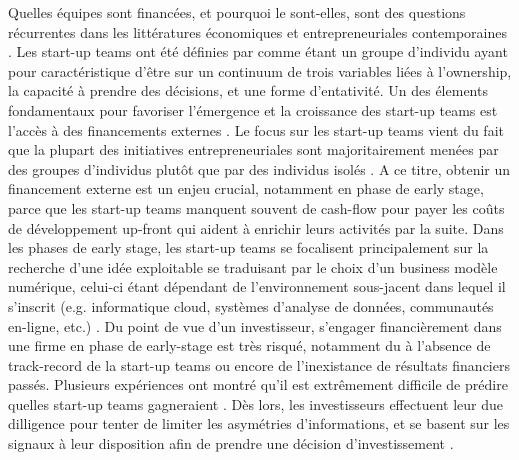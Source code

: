 \documentclass[12pt]{article}
\begin{document}
Quelles équipes sont financées, et pourquoi le sont-elles, sont des questions récurrentes dans les littératures économiques et entrepreneuriales contemporaines \citep{knight2020start}. Les start-up teams ont été définies par \citet{knight2020start} comme étant un groupe d'individu ayant pour caractéristique d'être sur un continuum de trois variables liées à l'ownership, la capacité à prendre des décisions, et une forme d'entativité. Un des élements fondamentaux pour favoriser l'émergence et la croissance des start-up teams est l'accès à des financements externes \citep{klein2020start}. Le focus sur les start-up teams vient du fait que la plupart des initiatives entrepreneuriales sont majoritairement menées par des groupes d'individus plutôt que par des individus isolés \citep{klotz2014new, roure1990predictors}. A ce titre, obtenir un financement externe est un enjeu crucial, notamment en phase de early stage, parce que les start-up teams manquent souvent de cash-flow pour payer les coûts de développement up-front qui aident à enrichir leurs activités par la suite. Dans les phases de early stage, les start-up teams se focalisent principalement sur la recherche d'une idée exploitable se traduisant par le choix d'un business modèle numérique, celui-ci étant dépendant de l'environnement sous-jacent dans lequel il s'inscrit (e.g. informatique cloud, systèmes d’analyse de données, communautés en-ligne, etc.) \citep{nambisan2017digital}. Du point de vue d'un investisseur, s'engager financièrement dans une firme en phase de early-stage est très risqué, notamment du à l'absence de track-record de la start-up teams ou encore de l'inexistance de résultats financiers passés. Plusieurs expériences ont montré qu'il est extrêmement difficile de prédire quelles start-up teams gagneraient \citep{aldrich2018unicorns, ghassemiautomated, coad2020catching, duhigg2016google}. Dès lors, les investisseurs effectuent leur due dilligence pour tenter de limiter les asymétries d'informations, et se basent sur les signaux \citep{spence1978job} à leur disposition afin de prendre une décision d'investissement \citep{ko2018signaling}.
\end{document}
